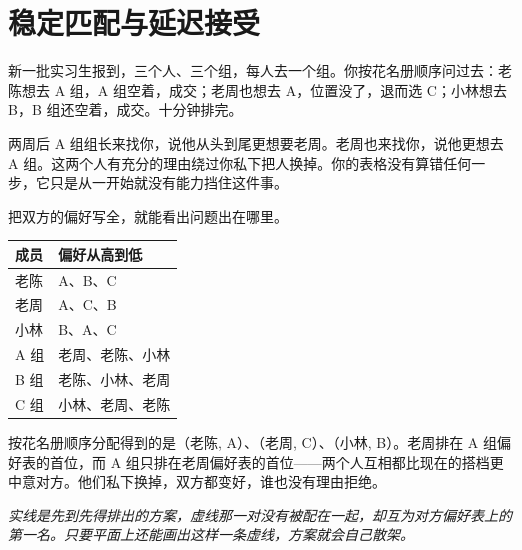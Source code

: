 \section{稳定匹配与延迟接受}
\label{sec:04-Discrete-Mathematics/03-Graph-Theory/06}

新一批实习生报到，三个人、三个组，每人去一个组。你按花名册顺序问过去：老陈想去 A 组，A 组空着，成交；老周也想去 A，位置没了，退而选 C；小林想去 B，B 组还空着，成交。十分钟排完。

两周后 A 组组长来找你，说他从头到尾更想要老周。老周也来找你，说他更想去 A 组。这两个人有充分的理由绕过你私下把人换掉。你的表格没有算错任何一步，它只是从一开始就没有能力挡住这件事。

把双方的偏好写全，就能看出问题出在哪里。

{\def\LTcaptype{none}
\begin{longtable}{@{}ll@{}}
\toprule\noalign{}
成员 & 偏好从高到低 \\
\midrule\noalign{}
\endhead
\bottomrule\noalign{}
\endlastfoot
老陈 & A、B、C \\
老周 & A、C、B \\
小林 & B、A、C \\
A 组 & 老周、老陈、小林 \\
B 组 & 老陈、小林、老周 \\
C 组 & 小林、老周、老陈 \\
\end{longtable}
}

按花名册顺序分配得到的是（老陈, A）、（老周, C）、（小林, B）。老周排在 A 组偏好表的首位，而 A 组只排在老周偏好表的首位——两个人互相都比现在的搭档更中意对方。他们私下换掉，双方都变好，谁也没有理由拒绝。

\begin{center}

\emph{实线是先到先得排出的方案，虚线那一对没有被配在一起，却互为对方偏好表上的第一名。只要平面上还能画出这样一条虚线，方案就会自己散架。}
\end{center}

